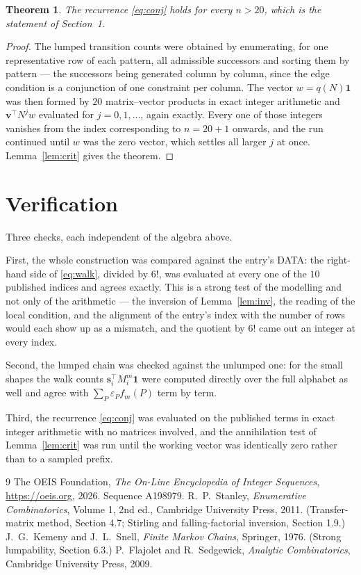 \documentclass[11pt,a4paper]{article}
\theoremstyle{plain}
\newtheorem{theorem}{Theorem}
\theoremstyle{definition}
\begin{document}
\begin{theorem}
The recurrence \eqref{eq:conj} holds for every $n>20$, which is the statement of
Section~1.
\end{theorem}

\begin{proof}
The lumped transition counts were obtained by enumerating, for one representative row of
each pattern, all admissible successors and sorting them by pattern --- the successors being
generated column by column, since the edge condition is a conjunction of one constraint per
column. The vector $w=q(N)\mathbf{1}$ was then formed by $20$ matrix--vector products
in exact integer arithmetic and $\mathbf{v}^{\!\top}N^{j}w$ evaluated for
$j=0,1,\dots$, again exactly. Every one of those integers vanishes from the index
corresponding to $n=20+1$ onwards, and the run continued until $w$ was the zero vector,
which settles all larger $j$ at once. Lemma~\ref{lem:crit} gives the theorem.
\end{proof}

\section{Verification}

Three checks, each independent of the algebra above.

First, the whole construction was compared against the entry's DATA: the right-hand side of
\eqref{eq:walk}, divided by $6!$, was evaluated at every one of the $10$
published indices and agrees exactly. This is a strong test of the modelling and not only of
the arithmetic --- the inversion of Lemma~\ref{lem:inv}, the reading of the local
condition, and the alignment of the entry's index with the number of rows would each
show up as a mismatch, and the quotient by $6!$ came out an integer at every index.

Second, the lumped chain was checked against the unlumped one: for the small shapes the walk
counts $\mathbf{s}_i^{\!\top}M_i^{m}\mathbf{1}$ were computed directly over the full
alphabet as well and agree with $\sum_P\varepsilon_Pf_m(P)$ term by term.

Third, the recurrence \eqref{eq:conj} was evaluated on the published terms in exact integer
arithmetic with no matrices involved, and the annihilation test of Lemma~\ref{lem:crit} was
run until the working vector was identically zero rather than to a sampled prefix.

\begin{thebibliography}{9}
 The OEIS Foundation, \emph{The On-Line Encyclopedia of Integer
Sequences}, \url{https://oeis.org}, 2026. Sequence A198979.
 R.~P.~Stanley, \emph{Enumerative Combinatorics}, Volume 1, 2nd ed.,
Cambridge University Press, 2011. (Transfer-matrix method, Section 4.7; Stirling and
falling-factorial inversion, Section 1.9.)
 J.~G.~Kemeny and J.~L.~Snell, \emph{Finite Markov Chains}, Springer,
1976. (Strong lumpability, Section 6.3.)
 P.~Flajolet and R.~Sedgewick, \emph{Analytic Combinatorics}, Cambridge
University Press, 2009.
\end{thebibliography}
\end{document}

